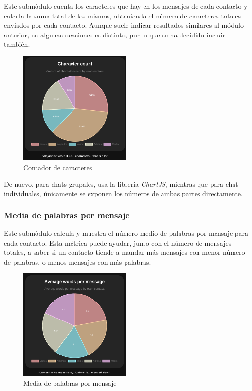 Este submódulo cuenta los caracteres que hay en los mensajes de cada contacto y calcula la suma total de los mismos, obteniendo el número de caracteres totales enviados por cada contacto. Aunque suele indicar resultados similares al módulo anterior, en algunas ocasiones es distinto, por lo que se ha decidido incluir también.

\begin{figure}[H]
	\centering
	\includegraphics[width=0.5\textwidth]{img/char_count.png}
	\caption{Contador de caracteres}
	\label{fig:chap4:char_count}
\end{figure}

De nuevo, para chats grupales, usa la librería \textit{ChartJS}, mientras que para chat individuales, únicamente se exponen los números de ambas partes directamente.

\subsubsection{Media de palabras por mensaje}

Este submódulo calcula y muestra el número medio de palabras por mensaje para cada contacto. Esta métrica puede ayudar, junto con el número de mensajes totales, a saber si un contacto tiende a mandar más mensajes con menor número de palabras, o menos mensajes con más palabras.

\begin{figure}[H]
	\centering
	\includegraphics[width=0.5\textwidth]{img/word_avg.png}
	\caption{Media de palabras por mensaje}
	\label{fig:chap4:word_avg}
\end{figure}

